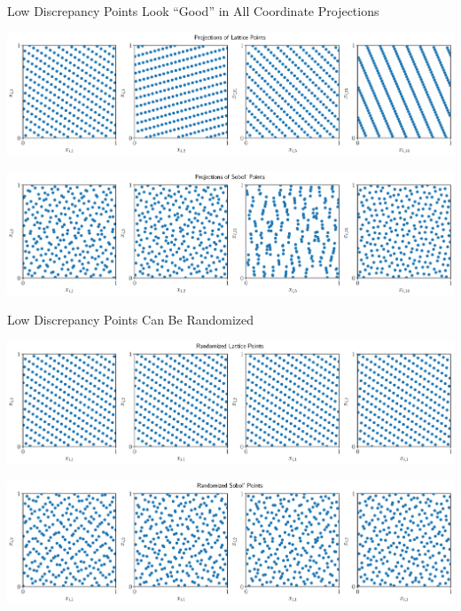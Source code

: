 \documentclass[10pt,compress,xcolor={usenames,dvipsnames},aspectratio=169]{beamer}
\begin{document}
\begin{frame}{Low Discrepancy Points Look ``Good'' in All Coordinate Projections}
	\vspace{-3.2ex}

	\includegraphics[width=\textwidth]{latticeptsproj.eps}

	\vspace{-4.3ex}

	\includegraphics[width=\textwidth]{sobolptsproj.eps}


\end{frame}

\begin{frame}{Low Discrepancy Points Can Be Randomized}
	\vspace{-3.2ex}

	\includegraphics[width=\textwidth]{latticeptsrand.eps}

	\vspace{-4.3ex}

	\includegraphics[width=\textwidth]{sobolptsrand.eps}


\end{frame}
\end{document}
